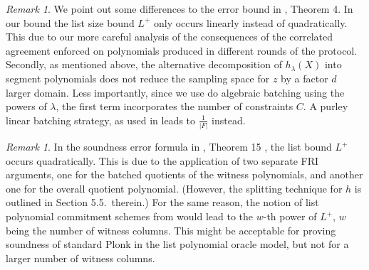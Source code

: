 \documentclass[11pt]{article}
\theoremstyle{definition}
\theoremstyle{remark}
\newtheorem{rem}[thm]{Remark}
\begin{document}
\begin{rem}
We point out some differences to the error bound in \cite{ethSTARK}, Theorem 4.
In our bound the list size bound $L^+$ only occurs linearly instead of quadratically. 
This due to our more careful analysis of the consequences of the correlated agreement enforced on polynomials produced in different rounds of the protocol. 
Secondly, as mentioned above, the alternative decomposition of $h_{\lambda}(X)$ into segment polynomials does not reduce the sampling space for $z$ by a factor $d$ larger domain.  
Less importantly, since we use do algebraic batching using the powers of $\lambda$, the first term incorporates the number of constraints $C$. 
A purley linear batching strategy, as used in \cite{ethSTARK} leads to $\frac{1}{|F|}$ instead.
\end{rem}

\begin{rem}
 In the soundness error formula in  \cite{DEEPFRI}, Theorem 15 , the list bound $L^+$ occurs quadratically. 
This is due to the application of two separate FRI arguments, one for the batched quotients of the witness polynomials, and another one for the overall quotient polynomial.  
(However, the splitting technique for $h$ is outlined in Section 5.5.~therein.)
For the same reason, the notion of list polynomial commitment schemes from \cite{Redshift} would lead to the  $w$-th power of $L^+$, $w$ being the number of witness columns.
This might be acceptable for proving soundness of standard Plonk in the list polynomial oracle model, but not for a larger number of witness columns. 
\end{rem}
\end{document}
